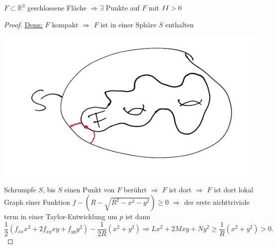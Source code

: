 \documentclass[a4paper,11pt,notitlepage]{report}
\theoremstyle{definition}
\newcommand{\R}{{\ensuremath{\mathbb{R}}}}
\newcommand{\RM}[1]{\MakeUppercase{\romannumeral #1{}}}
\begin{document}
\begin{theorem}
	$F \subset \R^3$ geschlossene Fläche $\Rightarrow \exists$ Punkte auf $F$ mit $\RM{2} > 0$
\end{theorem}
\begin{proof}
 \underline{Denn:} $F$ kompakt $\Rightarrow$ $F$ ist in einer Sphäre $S$ enthalten
 \begin{center}
		\includegraphics[scale=0.4]{images/2012_01_26_Bild10.jpg}
	\end{center}
	Schrumpfe $S$, bis $S$ einen Punkt von $F$ berührt $\Rightarrow$ $F$ ist dort $\Rightarrow$ $F$ ist dort lokal Graph einer Funktion $f-(R - \sqrt{R^2 - x^2 - y^2}) \geq 0$
	$\Rightarrow$ der erste nichttriviale term in einer Taylor-Entwicklung um $p$ ist dann  $$\frac{1}{2} (f_{xx} x^2 + 2 f_{xy} xy + f_{yy} y^2) - \frac{1}{2R} (x^2 + y^2) \Rightarrow Lx^2 + 2 M xy + N y^2 \geq \frac{1}{R} (x^2+y^2) > 0.$$
\end{proof}
\end{document}
